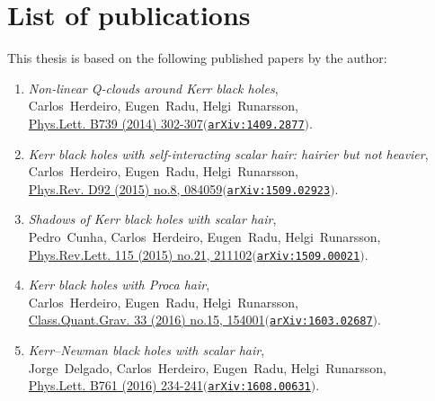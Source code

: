 %
\chapter{List of publications}
%
This thesis is based on the following published papers by the author:
%
\begin{enumerate}

\item
  {
  \textit{Non-linear Q-clouds around Kerr black holes}, \\
  Carlos~Herdeiro, Eugen~Radu, Helgi~Runarsson, \\
  {}\href{http://www.sciencedirect.com/science/article/pii/S0370269314008077}
  {Phys.Lett. B739 (2014) 302-307}\;$(${}\href{http://arxiv.org/abs/1409.2877}{\tt arXiv:1409.2877}$)$.
  }

\item
  {
  \textit{Kerr black holes with self-interacting scalar hair: hairier but not heavier}, \\
  Carlos~Herdeiro, Eugen~Radu, Helgi~Runarsson, \\
  {}\href{http://journals.aps.org/prd/abstract/10.1103/PhysRevD.92.084059}
  {Phys.Rev. D92 (2015) no.8, 084059}\;$(${}\href{http://arxiv.org/abs/1509.02923}{\tt arXiv:1509.02923}$)$.
  }

\item
  {
  \textit{Shadows of Kerr black holes with scalar hair}, \\
  Pedro~Cunha, Carlos~Herdeiro, Eugen~Radu, Helgi~Runarsson, \\
  {}\href{http://journals.aps.org/prl/abstract/10.1103/PhysRevLett.115.211102}
  {Phys.Rev.Lett. 115 (2015) no.21, 211102}\;$(${}\href{http://arxiv.org/abs/1509.00021}{\tt arXiv:1509.00021}$)$.
  }

\item
  {
  \textit{Kerr black holes with Proca hair},\\
  Carlos~Herdeiro, Eugen~Radu, Helgi~Runarsson, \\
  {}\href{http://iopscience.iop.org/article/10.1088/0264-9381/33/15/154001/meta}
  {Class.Quant.Grav. 33 (2016) no.15, 154001}\;$(${}\href{http://arxiv.org/abs/1603.02687}{\tt arXiv:1603.02687}$)$.
  }

\item
  {
  \textit{Kerr–Newman black holes with scalar hair},\\
  Jorge~Delgado, Carlos~Herdeiro, Eugen~Radu, Helgi~Runarsson, \\
  {}\href{http://www.sciencedirect.com/science/article/pii/S037026931630452X}
  {Phys.Lett. B761 (2016) 234-241}\;$(${}\href{http://arxiv.org/abs/1608.00631}{\tt arXiv:1608.00631}$)$.
  }
\end{enumerate}





